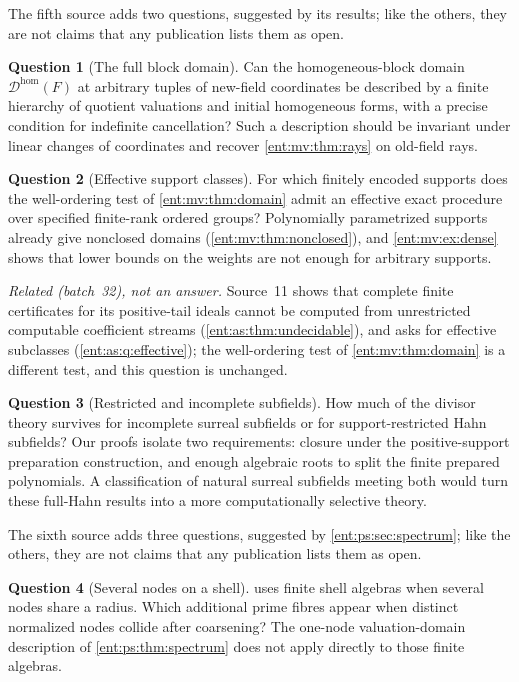 \documentclass[11pt]{article}
\theoremstyle{plain}
\theoremstyle{plain}
\theoremstyle{plain}
\theoremstyle{definition}
\theoremstyle{definition}
\theoremstyle{definition}
\theoremstyle{definition}
\newtheorem{question}[question]{Question}
\theoremstyle{remark}
\begin{document}
The fifth source adds two questions, suggested by its results; like the
others, they are not claims that any publication lists them as open.

\begin{question}[The full block domain]\label{ent:mv:q:block-domain}
Can the homogeneous-block domain $\mathcal D^{\mathrm{hom}}(F)$ at arbitrary
tuples of new-field coordinates be described by a finite hierarchy of
quotient valuations and initial homogeneous forms, with a precise condition
for indefinite cancellation? Such a description should be invariant under
linear changes of coordinates and recover \cref{ent:mv:thm:rays} on old-field
rays.
\end{question}

\begin{question}[Effective support classes]\label{ent:mv:q:effective}
For which finitely encoded supports does the well-ordering test of
\cref{ent:mv:thm:domain} admit an effective exact procedure over specified
finite-rank ordered groups? Polynomially parametrized supports already give
nonclosed domains (\cref{ent:mv:thm:nonclosed}), and \cref{ent:mv:ex:dense}
shows that lower bounds on the weights are not enough for arbitrary
supports.
\end{question}
\emph{Related (batch~32), not an answer.} Source~11 shows that complete
finite certificates for its positive-tail ideals cannot be computed from
unrestricted computable coefficient streams (\cref{ent:as:thm:undecidable}),
and asks for effective subclasses (\cref{ent:as:q:effective}); the
well-ordering test of \cref{ent:mv:thm:domain} is a different test, and this
question is unchanged.

\begin{question}[Restricted and incomplete subfields]\label{ent:q:subfields}
How much of the divisor theory survives for incomplete surreal subfields or
for support-restricted Hahn subfields? Our proofs isolate two requirements:
closure under the positive-support preparation construction, and enough
algebraic roots to split the finite prepared polynomials. A classification of
natural surreal subfields meeting both would turn these full-Hahn results
into a more computationally selective theory.
\end{question}

The sixth source adds three questions, suggested by
\cref{ent:ps:sec:spectrum}; like the others, they are not claims that any
publication lists them as open.

\begin{question}[Several nodes on a shell]\label{ent:ps:q:several-nodes}
 uses finite shell algebras when several nodes share a
radius. Which additional prime fibres appear when distinct normalized nodes
collide after coarsening? The one-node valuation-domain description of
\cref{ent:ps:thm:spectrum} does not apply directly to those finite algebras.
\end{question}
\end{document}
